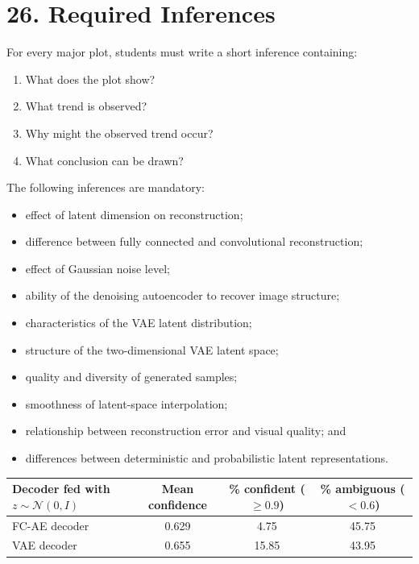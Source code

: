 \documentclass[10pt]{article}
\begin{document}
\section*{26. Required Inferences}

For every major plot, students must write a short inference containing:

\begin{enumerate}
\item What does the plot show?
\item What trend is observed?
\item Why might the observed trend occur?
\item What conclusion can be drawn?
\end{enumerate}

The following inferences are mandatory:

\begin{itemize}
\item effect of latent dimension on reconstruction;
\item difference between fully connected and convolutional reconstruction;
\item effect of Gaussian noise level;
\item ability of the denoising autoencoder to recover image structure;
\item characteristics of the VAE latent distribution;
\item structure of the two-dimensional VAE latent space;
\item quality and diversity of generated samples;
\item smoothness of latent-space interpolation;
\item relationship between reconstruction error and visual quality; and
\item differences between deterministic and probabilistic latent representations.
\end{itemize}

\begin{center}
\begin{tabular}{|l|c|c|c|}
\hline
Decoder fed with $z\sim\mathcal{N}(0,I)$ & Mean confidence & \% confident ($\geq0.9$) & \% ambiguous ($<0.6$)\\
\hline
FC-AE decoder & 0.629 & 4.75 & 45.75\\
VAE decoder & 0.655 & 15.85 & 43.95\\
\hline
\end{tabular}
\end{center}
\end{document}
